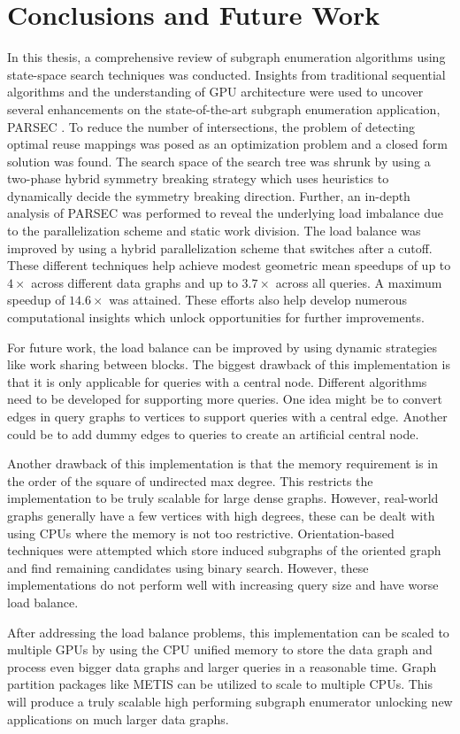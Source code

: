 \chapter{Conclusions and Future Work}\label{chap:conclusions}

In this thesis, a comprehensive review of subgraph enumeration algorithms using state-space search techniques was conducted.
Insights from traditional sequential algorithms and the understanding of GPU architecture were used to uncover several enhancements on the state-of-the-art subgraph enumeration application, PARSEC \cite{PARSEC_VD}.
To reduce the number of intersections, the problem of detecting optimal reuse mappings was posed as an optimization problem and a closed form solution was found.
The search space of the search tree was shrunk by using a two-phase hybrid symmetry breaking strategy which uses heuristics to dynamically decide the symmetry breaking direction.
Further, an in-depth analysis of PARSEC \cite{PARSEC_VD} was performed to reveal the underlying load imbalance due to the parallelization scheme and static work division.
The load balance was improved by using a hybrid parallelization scheme that switches after a cutoff.
These different techniques help achieve modest geometric mean speedups of up to $4\times$ across different data graphs and up to $3.7\times$ across all queries. A maximum speedup of $14.6\times$ was attained.
These efforts also help develop numerous computational insights which unlock opportunities for further improvements.

For future work, the load balance can be improved by using dynamic strategies like work sharing between blocks.
The biggest drawback of this implementation is that it is only applicable for queries with a central node.
Different algorithms need to be developed for supporting more queries.
One idea might be to convert edges in query graphs to vertices to support queries with a central edge.
Another could be to add dummy edges to queries to create an artificial central node.

Another drawback of this implementation is that the memory requirement is in the order of the square of undirected max degree. This restricts the implementation to be truly scalable for large dense graphs. However, real-world graphs generally have a few vertices with high degrees, these can be dealt with using CPUs where the memory is not too restrictive.
Orientation-based techniques were attempted which store induced subgraphs of the oriented graph and find remaining candidates using binary search.
However, these implementations do not perform well with increasing query size and have worse load balance.

After addressing the load balance problems, this implementation can be scaled to multiple GPUs by using the CPU unified memory to store the data graph and process even bigger data graphs and larger queries in a reasonable time.
Graph partition packages like METIS \cite{metis} can be utilized to scale to multiple CPUs.
This will produce a truly scalable high performing subgraph enumerator unlocking new applications on much larger data graphs.
